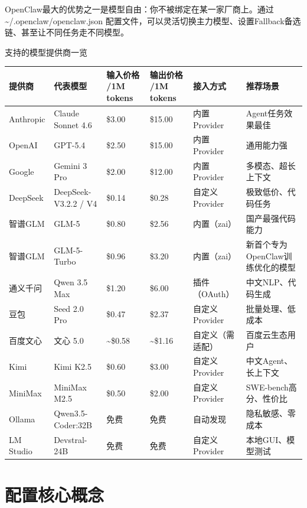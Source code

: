 \documentclass[
  10
]{article}
\newcounter{none} %
\begin{document}
OpenClaw最大的优势之一是模型自由：你不被绑定在某一家厂商上。通过
\textasciitilde/.openclaw/openclaw.json
配置文件，可以灵活切换主力模型、设置Fallback备选链、甚至让不同任务走不同模型。

支持的模型提供商一览

{\def\LTcaptype{none} %
\begin{longtable}[]{@{}|l|l|l|l|l|l|@{}}
\toprule\noalign{}
\endhead
\bottomrule\noalign{}
\endlastfoot
\hline
提供商 & 代表模型 & 输入价格 /1M tokens & 输出价格 /1M tokens & 接入方式
& 推荐场景 \\
\hline
Anthropic & Claude Sonnet 4.6 & \$3.00 & \$15.00 & 内置Provider &
Agent任务效果最佳 \\
\hline
OpenAI & GPT-5.4 & \$2.50 & \$15.00 & 内置Provider & 通用能力强 \\
\hline
Google & Gemini 3 Pro & \$2.00 & \$12.00 & 内置Provider &
多模态、超长上下文 \\
\hline
DeepSeek & DeepSeek-V3.2.2 / V4 & \$0.14 & \$0.28 & 自定义Provider &
极致低价、代码任务 \\
\hline
智谱GLM & GLM-5 & \$0.80 & \$2.56 & 内置（zai） & 国产最强代码能力 \\
\hline
智谱GLM & GLM-5-Turbo & \$0.96 & \$3.20 & 内置（zai） &
新首个专为OpenClaw训练优化的模型 \\
\hline
通义千问 & Qwen 3.5 Max & \$1.20 & \$6.00 & 插件（OAuth） &
中文NLP、代码生成 \\
\hline
豆包 & Seed 2.0 Pro & \$0.47 & \$2.37 & 自定义Provider &
批量处理、低成本 \\
\hline
百度文心 & 文心 5.0 & \textasciitilde\$0.58 & \textasciitilde\$1.16 &
自定义（需适配） & 百度云生态用户 \\
\hline
Kimi & Kimi K2.5 & \$0.60 & \$3.00 & 自定义Provider &
中文Agent、长上下文 \\
\hline
MiniMax & MiniMax M2.5 & \$0.50 & \$2.00 & 自定义Provider &
SWE-bench高分、性价比 \\
\hline
Ollama & Qwen3.5-Coder:32B & 免费 & 免费 & 自动发现 &
隐私敏感、零成本 \\
\hline
LM Studio & Devstral-24B & 免费 & 免费 & 自定义Provider &
本地GUI、模型测试 \\
\hline
\end{longtable}
}

\section{配置核心概念}\label{ux914dux7f6eux6838ux5fc3ux6982ux5ff5}
\end{document}
